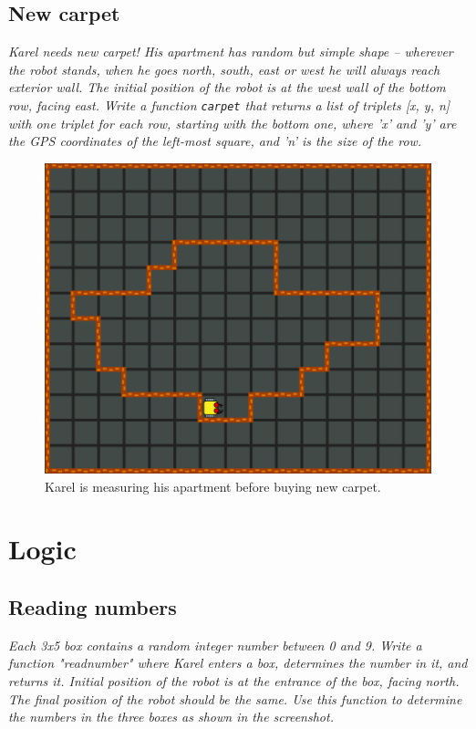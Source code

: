 {{\subsection{New carpet}

{\em Karel needs new carpet! His apartment has random but simple shape -- wherever 
the robot stands, when he goes north, south, east or west he will always reach exterior wall.
The initial position of the robot is at the west wall of the bottom row, facing east. 
Write a function {\tt carpet} that returns a list of triplets [x, y, n] with one triplet for each
row, starting with the bottom one, where 'x' and 'y' are the GPS coordinates of the left-most
square, and 'n' is the size of the row. }


\begin{figure}[!ht]
\begin{center}
\includegraphics[height=0.4\textwidth]{img/h04.png}
\end{center}
\vspace{-4mm}
\caption{Karel is measuring his apartment before buying new carpet.}
\vspace{-1cm}
\label{fig:h04}
\end{figure}
\newpage


\section{Logic}

\subsection{Reading numbers}

{\em Each 3x5 box contains a random integer number between 0 and 9. Write a function "readnumber" 
where Karel enters a box, determines the number in it, and returns it. Initial position of the 
robot is at the entrance of the box, facing north. The final position of the robot should be the same. 
Use this function to determine the numbers in the three boxes as shown in the screenshot. }

}}
